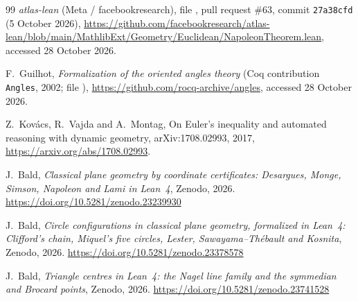 \documentclass[11pt]{article}
\theoremstyle{definition}
\theoremstyle{remark}
\begin{document}
\begin{thebibliography}{99}
\emph{atlas-lean} (Meta / facebookresearch), file
, pull request \#63, commit
\texttt{27a38cfd} (5 October 2026),
\url{https://github.com/facebookresearch/atlas-lean/blob/main/MathlibExt/Geometry/Euclidean/NapoleonTheorem.lean},
accessed 28 October 2026.

F.~Guilhot, \emph{Formalization of the oriented angles theory} (Coq contribution \texttt{Angles}, 2002;
file ), \url{https://github.com/rocq-archive/angles}, accessed 28 October 2026.

Z.~Kov\'acs, R.~Vajda and A.~Montag, On Euler's inequality and automated reasoning with dynamic
geometry, arXiv:1708.02993, 2017, \url{https://arxiv.org/abs/1708.02993}.

J.~Bald,
\emph{Classical plane geometry by coordinate certificates: Desargues, Monge, Simson, Napoleon and Lami in Lean~4},
Zenodo, 2026. \url{https://doi.org/10.5281/zenodo.23239930}

J.~Bald,
\emph{Circle configurations in classical plane geometry, formalized in Lean~4: Clifford's chain, Miquel's five circles, Lester, Sawayama--Th\'ebault and Kosnita},
Zenodo, 2026. \url{https://doi.org/10.5281/zenodo.23378578}

J.~Bald,
\emph{Triangle centres in Lean~4: the Nagel line family and the symmedian and Brocard points},
Zenodo, 2026. \url{https://doi.org/10.5281/zenodo.23741528}
\end{thebibliography}
\end{document}
